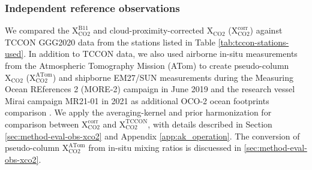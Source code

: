 \subsubsection*{Independent reference observations}
We compared the $\mathrm{X_{CO2}^{B11}}$ and cloud-proximity-corrected $\mathrm{X_{CO2}}$ ($\mathrm{X_{CO2}^{corr}}$) against TCCON GGG2020 data \citep{laughner2024ggg2020} from the stations listed in Table \ref{tab:tccon-stations-used}. In addition to TCCON data, we also used airborne in-situ measurements from the Atmospheric Tomography Mission (ATom) to create pseudo-column $\mathrm{X_{CO2}}$ ($\mathrm{X_{CO2}^{ATom}}$) and shipborne EM27/SUN measurements during the Measuring Ocean REferences 2 (MORE-2) campaign in June 2019 and the research vessel Mirai campaign MR21-01 in 2021 as additional OCO-2 ocean footprints comparison \citep{wofsy2018atom_nav, mckain2021atom_picarro, knapp2020more2_pangaea, hanft2021mr2101_pangaea}. We apply the averaging-kernel and prior harmonization for comparison between $\mathrm{X_{CO2}^{corr}}$ and $\mathrm{X_{CO2}^{TCCON}}$, with details described in Section \ref{sec:method-eval-obs-xco2} and Appendix \ref{app:ak_operation}. The conversion of pseudo-column $\mathrm{X_{CO2}^{ATom}}$ from in-situ  mixing ratios is discuessed in \ref{sec:method-eval-obs-xco2}.








